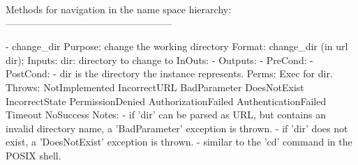 \begin{myspec}
 
    Methods for navigation in the name space hierarchy:
    ---------------------------------------------------
 
    - change_dir
      Purpose:  change the working directory
      Format:   change_dir         (in  url        dir);
      Inputs:   dir:                directory to change to
      InOuts:   -
      Outputs:  -
      PreCond:  -
      PostCond: - dir is the directory the instance represents.
      Perms:    Exec for dir.
      Throws:   NotImplemented
                IncorrectURL
                BadParameter
                DoesNotExist
                IncorrectState
                PermissionDenied
                AuthorizationFailed
                AuthenticationFailed
                Timeout
                NoSuccess
      Notes:    - if 'dir' can be parsed as URL, but contains an
                  invalid directory name, a 'BadParameter'
                  exception is thrown.
                - if 'dir' does not exist, a 'DoesNotExist'
                  exception is thrown.
                - similar to the 'cd' command in the POSIX 
                  shell.
 

\end{myspec}
